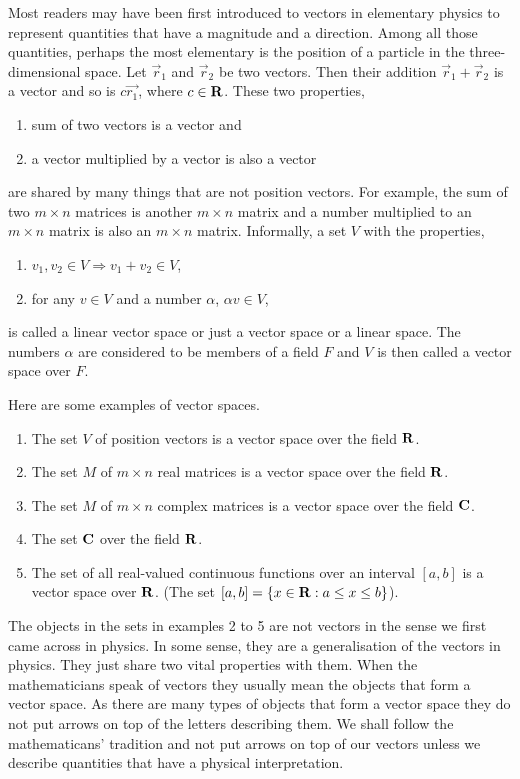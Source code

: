 Most readers may have been first introduced to vectors in elementary physics to
represent quantities that have a magnitude and a direction. Among all those
quantities, perhaps the most elementary is the position of a particle in the
three-dimensional space. Let $\vec{r}_1$ and $\vec{r}_2$ be two vectors. Then
their addition $\vec{r}_1 + \vec{r}_2$ is a vector and so is $c\vec{r_1}$,
where $c \in \mathbf{R}$. These two properties,
\begin{enumerate}
\item sum of two vectors is a vector and
\item a vector multiplied by a vector is also a vector
\end{enumerate}
are shared by many things that are not position vectors. For example, the
sum of two $m \times n$ matrices is another $m \times n$ matrix and a number
multiplied to an $m \times n$ matrix is also an $m \times n$ matrix. Informally,
a set $V$ with the properties,
\begin{enumerate}
\item $v_1, v_2 \in V \Rightarrow v_1 + v_2 \in V$,
\item for any $v \in V$ and a number $\alpha$, $\alpha v \in V$,
\end{enumerate}
is called a linear vector space or just a vector space or a linear space. The 
numbers $\alpha$ are considered to be members of a field $F$ and $V$ is then
called a vector space over $F$. 

Here are some examples of vector spaces.
\begin{enumerate}
\item The set $V$ of position vectors is a vector space over the field $\mathbf{R}$.
\item The set $M$ of $m \times n$ real matrices is a vector space over the
field $\mathbf{R}$.
\item The set $M$ of $m \times n$ complex matrices is a vector space over the
field $\mathbf{C}$.
\item The set $\mathbf{C}$ over the field $\mathbf{R}$.
\item The set of all real-valued continuous functions over an interval $[a, b]$
is a vector space over $\mathbf{R}$. (The set $[a, b] = \{x \in \mathbf{R} : a \le x \le b
\}$).
\end{enumerate}
The objects in the sets in examples 2 to 5 are not vectors in the sense we 
first came across in physics. In some sense, they are a generalisation of the 
vectors in physics. They just share two vital properties with them. When the
mathematicians speak of vectors they usually mean the objects that form a 
vector space. As there are many types of objects that form a vector space they
do not put arrows on top of the letters describing them. We shall follow the
mathematicans' tradition and not put arrows on top of our vectors unless we 
describe quantities that have a physical interpretation.

